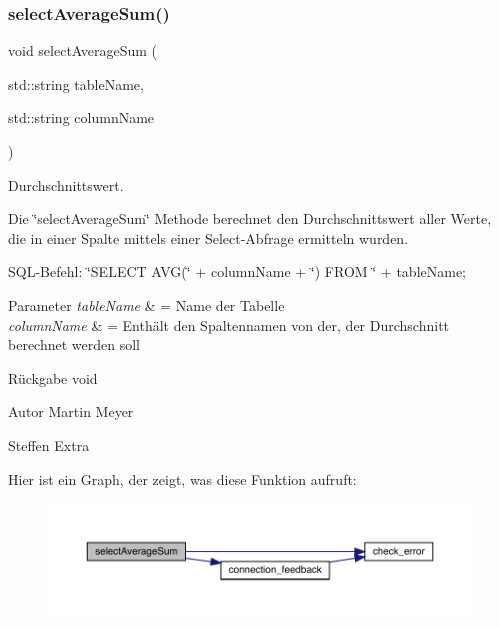 \subsubsection{select\+Average\+Sum()}
{\footnotesize\ttfamily void select\+Average\+Sum (\begin{DoxyParamCaption}\item[{std\+::string}]{table\+Name,  }\item[{std\+::string}]{column\+Name }\end{DoxyParamCaption})}



Durchschnittswert. 

Die \char`\"{}select\+Average\+Sum\char`\"{} Methode berechnet den Durchschnittswert aller Werte, die in einer Spalte mittels einer Select-\/\+Abfrage ermitteln wurden.~\newline


S\+Q\+L-\/\+Befehl\+: \char`\"{}\+S\+E\+L\+E\+C\+T A\+V\+G(\char`\"{} + column\+Name + \char`\"{}) F\+R\+O\+M \char`\"{} + table\+Name;


\begin{DoxyParams}{Parameter}
{\em table\+Name} & = Name der Tabelle \\
\hline
{\em column\+Name} & = Enthält den Spaltennamen von der, der Durchschnitt berechnet werden soll\\
\hline
\end{DoxyParams}
\begin{DoxyReturn}{Rückgabe}
void
\end{DoxyReturn}
\begin{DoxyAuthor}{Autor}
Martin Meyer 

Steffen Extra 
\end{DoxyAuthor}
Hier ist ein Graph, der zeigt, was diese Funktion aufruft\+:\nopagebreak
\begin{figure}[H]
\begin{center}
\leavevmode
\includegraphics[width=350pt]{selection_request_8cpp_a01bd0062142a17ad04b7101bac7b38b6_cgraph}
\end{center}
\end{figure}
\mbox{\label{selection_request_8cpp_aaa15591ca7a3ba5d40fa77b7ae6753db}} 
